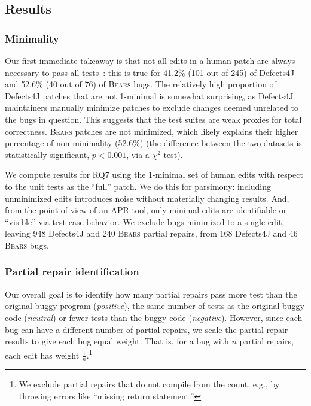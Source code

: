 \documentclass[10pt,journal,compsoc]{IEEEtran}
\newcommand\bears{\textsc{Bears}\xspace}
\begin{document}
\subsection{Results}

\subsubsection{Minimality} Our first immediate takeaway is that not all edits
in a human patch are always necessary to pass all tests~\cite{api-refactoring,
  tangledchanges}:
this is true for 41.2\%  (101 out of 245) of Defects4J and 52.6\% (40 out of 76) of
\bears bugs. 
The relatively high proportion of Defects4J patches that are not 1-minimal is
somewhat surprising, as Defects4J maintainers manually minimize patches to exclude
changes deemed unrelated to the bugs in question.
This suggests that the test suites are weak proxies for total correctness.
\bears patches are not minimized, which likely explains
their higher percentage of non-minimality (52.6\%) (the difference between the two datasets is statistically
significant, $p < 0.001$, via a 
$\chi^2$ test).

We compute results for RQ7 using the 1-minimal set of human edits
with respect to the unit tests as the ``full'' patch.
We do this for parsimony: including
unminimized edits introduces noise without materially changing
results.  And, from the point of view of an APR tool, only
minimal edits are identifiable or ``visible'' via test case behavior. 
We exclude bugs
minimized to a single edit, leaving
948 Defects4J and 240 \bears partial repairs, from
168 Defects4J and 46 \bears bugs.  


\subsubsection{Partial repair identification} Our overall goal is to identify how many partial repairs pass more test than the
original buggy program  (\emph{positive}), the  same number of tests as the
original buggy code (\emph{neutral}) or fewer tests than the buggy code
(\emph{negative}).  However, 
since each bug can have a different 
number of partial repairs, we
scale the partial repair results to give each bug equal weight.
That is, for a bug with $n$ partial repairs, each edit has weight 
$\frac{1}{n}$.\footnote{We exclude partial
repairs that do not compile from the count, e.g., by throwing errors like ``missing return statement.''}
\end{document}
